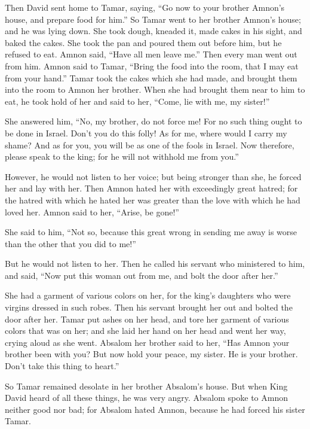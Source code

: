  Then David sent home to Tamar, saying, ``Go now to your
brother Amnon's house, and prepare food for him.''  So
Tamar went to her brother Amnon's house; and he was lying down. She took
dough, kneaded it, made cakes in his sight, and baked the cakes.
 She took the pan and poured them out before him, but he
refused to eat. Amnon said, ``Have all men leave me.'' Then every man
went out from him.  Amnon said to Tamar, ``Bring the food
into the room, that I may eat from your hand.'' Tamar took the cakes
which she had made, and brought them into the room to Amnon her brother.
 When she had brought them near to him to eat, he took
hold of her and said to her, ``Come, lie with me, my sister!''

 She answered him, ``No, my brother, do not force me! For
no such thing ought to be done in Israel. Don't you do this folly!
 As for me, where would I carry my shame? And as for you,
you will be as one of the fools in Israel. Now therefore, please speak
to the king; for he will not withhold me from you.''

 However, he would not listen to her voice; but being
stronger than she, he forced her and lay with her.  Then
Amnon hated her with exceedingly great hatred; for the hatred with which
he hated her was greater than the love with which he had loved her.
Amnon said to her, ``Arise, be gone!''

 She said to him, ``Not so, because this great wrong in
sending me away is worse than the other that you did to me!''

But he would not listen to her.  Then he called his
servant who ministered to him, and said, ``Now put this woman out from
me, and bolt the door after her.''

 She had a garment of various colors on her, for the
king's daughters who were virgins dressed in such robes. Then his
servant brought her out and bolted the door after her. 
Tamar put ashes on her head, and tore her garment of various colors that
was on her; and she laid her hand on her head and went her way, crying
aloud as she went.  Absalom her brother said to her,
``Has Amnon your brother been with you? But now hold your peace, my
sister. He is your brother. Don't take this thing to heart.''

So Tamar remained desolate in her brother Absalom's house.
 But when King David heard of all these things, he was
very angry.  Absalom spoke to Amnon neither good nor bad;
for Absalom hated Amnon, because he had forced his sister Tamar.

